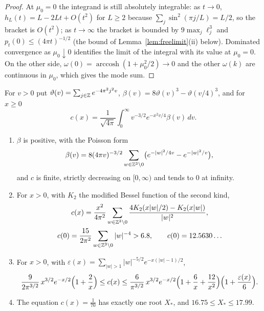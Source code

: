 \begin{proof}
At $\mu_0=0$ the integrand is still absolutely integrable: as $t\to0$, $h_L(t)=
L-2Lt+O(t^2)$ for $L\ge2$ because $\sum_{j}\sin^2(\pi j/L)=L/2$, so the bracket
is $O(t^2)$; as $t\to\infty$ the bracket is bounded by $9\max_j\ell_j^3$ and
$p_t(0)\le(4\pi t)^{-1/2}$ (the bound of Lemma~\ref{lem:freelimit}(ii) below).
Dominated convergence as $\mu_0\downarrow0$ identifies the limit of the
integral with its value at $\mu_0=0$. On the other side, $\omega(0)=
\operatorname{arccosh}(1+\mu_0^2/2)\to0$ and the other $\omega(k)$ are
continuous in $\mu_0$, which gives the mode sum.
\end{proof}

For $v>0$ put $\vartheta(v)=\sum_{j\in\mathbb{Z}}e^{-4\pi^2j^2v}$, $\beta(v)=8
\vartheta(v)^3-\vartheta(v/4)^3$, and for $x\ge0$
\begin{equation}\label{eq:cdef}
c(x)=\frac1{\sqrt{4\pi}}\int_0^\infty v^{-3/2}e^{-x^2v/4}\beta(v)\,dv .
\end{equation}

\begin{proposition}\label{prop:cfunction}
\begin{enumerate}[label=\textup{(\roman*)},leftmargin=*]
\item $\beta$ is positive, with the Poisson form
\[
\beta(v)=8(4\pi v)^{-3/2}\sum_{w\in\mathbb{Z}^3\setminus0}\bigl(e^{-|w|^2/4v}-
e^{-|w|^2/v}\bigr),
\]
and $c$ is finite, strictly decreasing on $[0,\infty)$ and tends to $0$ at
infinity.
\item For $x>0$, with $K_2$ the modified Bessel function of the second kind,
\begin{gather*}
c(x)=\frac{x^2}{4\pi^2}\sum_{w\in\mathbb{Z}^3\setminus0}\frac{4K_2(x|w|/2)-K_2(x|w|)}
{|w|^2},\\
c(0)=\frac{15}{2\pi^2}\sum_{w\in\mathbb{Z}^3\setminus0}|w|^{-4}>6.8,\qquad c(0)=12.5630\ldots
\end{gather*}
\item For $x>0$, with $\varepsilon(x)=\sum_{|w|>1}|w|^{-5/2}e^{-x(|w|-1)/2}$,
\[
\frac9{2\pi^{3/2}}\,x^{3/2}e^{-x/2}\Bigl(1+\frac2x\Bigr)\le c(x)\le
\frac6{\pi^{3/2}}\,x^{3/2}e^{-x/2}\Bigl(1+\frac6x+\frac{12}{x^2}\Bigr)\Bigl(1+
\frac{\varepsilon(x)}6\Bigr).
\]
\item The equation $c(x)=\frac1{70}$ has exactly one root $X_*$, and
$16.75\le X_*\le17.99$.
\end{enumerate}
\end{proposition}

